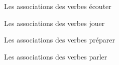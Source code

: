 \documentclass{beamer}
\begin{document}
  \begin{frame}{Les associations des verbes }
    \centering
    écouter

  \end{frame}

  \begin{frame}{Les associations des verbes }
    \centering
    jouer

  \end{frame}

  \begin{frame}{Les associations des verbes }
    \centering
    préparer

  \end{frame}

  \begin{frame}{Les associations des verbes }
    \centering
    parler

  \end{frame}



\end{document}
